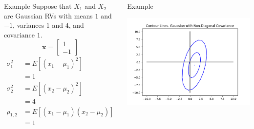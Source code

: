 \documentclass{beamer}
\begin{document}
\begin{frame}
  \begin{columns}
    \column{2.25in}
    \begin{block}{Example}
      Suppose that $X_1$ and $X_2$ are Gaussian RVs with means $1$ and
      $-1$, variances $1$ and $4$, and covariance $1$.
      \begin{displaymath}
        \mathbf{x}=\left[\begin{array}{c}1\\-1\end{array}\right]
      \end{displaymath}
      \begin{align*}
        \sigma_1^2 &=E\left[(x_1-\mu_1)^2\right]\\
        &= 1\\
        \sigma_2^2&=E\left[(x_2-\mu_2)^2\right]\\
        &=4\\
        \rho_{1,2}&=E\left[(x_1-\mu_1)(x_2-\mu_2)\right]\\
        &=1
      \end{align*}
    \end{block}
    \column{2in}
    \begin{block}{Example}
      \centerline{\includegraphics[width=\textwidth]{figs/covariance_example.png}}
    \end{block}
  \end{columns}    
\end{frame}
\end{document}
